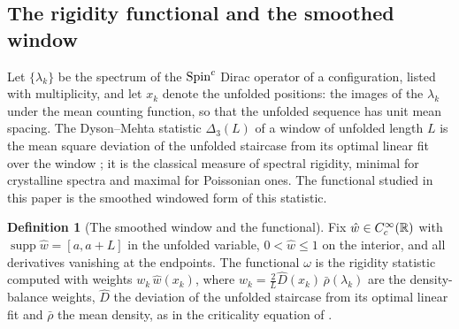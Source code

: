 \documentclass[11pt]{article}
\numberwithin{equation}{section}
\theoremstyle{plain}
\theoremstyle{definition}
\newtheorem{definition}[theorem]{Definition}
\theoremstyle{remark}
\begin{document}
\subsection{The rigidity functional and the smoothed window}
\label{sec:functional}

Let $\{\lambda_{k}\}$ be the spectrum of the $\text{Spin}^c$ Dirac
operator of a configuration, listed with multiplicity, and let
$x_{k}$ denote the unfolded positions: the images of the
$\lambda_{k}$ under the mean counting function, so that the
unfolded sequence has unit mean spacing. The Dyson--Mehta statistic
$\Delta_{3}(L)$ of a window of unfolded length $L$ is the mean
square deviation of the unfolded staircase from its optimal linear
fit over the window \cite{DysonMehta1963}; it is the classical
measure of spectral rigidity, minimal for crystalline spectra and
maximal for Poissonian ones. The functional studied in this paper
is the smoothed windowed form of this statistic.

\begin{definition}[The smoothed window and the
functional]\label{rb2:window}
Fix $\hat{w} \in C^{\infty}_{c}(\mathbb{R})$ with
$\operatorname{supp}\hat{w} = [a, a+L]$ in the unfolded variable,
$0 < \hat{w} \leq 1$ on the interior, and all derivatives vanishing
at the endpoints. The functional $\omega$ is the rigidity statistic
computed with weights $w_{k}\,\hat{w}(x_{k})$, where
$w_{k} = \tfrac{2}{L}\hat{D}(x_{k})\,\bar\rho(\lambda_{k})$ are the
density-balance weights, $\hat{D}$ the deviation of the unfolded
staircase from its optimal linear fit and $\bar\rho$ the mean
density, as in the criticality equation of \cite{MEF3}.
\end{definition}
\end{document}
